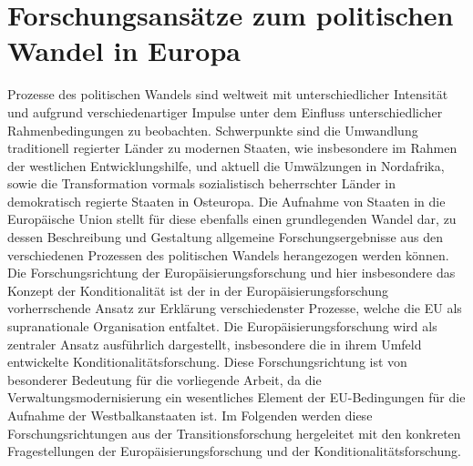 \chapter{Forschungsansätze zum politischen Wandel in Europa }
Prozesse des politischen Wandels sind weltweit mit unterschiedlicher Intensität und aufgrund verschiedenartiger Impulse unter dem Einfluss unterschiedlicher Rahmenbedingungen zu beobachten. Schwerpunkte sind die Umwandlung traditionell regierter Länder zu modernen Staaten, wie insbesondere im Rahmen der westlichen Entwicklungshilfe, und aktuell die Umwälzungen in Nordafrika, sowie die Transformation vormals sozialistisch beherrschter Länder in demokratisch regierte Staaten in Osteuropa. Die Aufnahme von Staaten in die Europäische Union stellt für diese ebenfalls einen grundlegenden Wandel dar, zu dessen Beschreibung und Gestaltung allgemeine Forschungsergebnisse aus den verschiedenen Prozessen des politischen Wandels herangezogen werden können. Die Forschungsrichtung der Europäisierungsforschung und hier insbesondere das Konzept der Konditionalität ist der in der Europäisierungsforschung vorherrschende Ansatz zur Erklärung verschiedenster Prozesse, welche die EU als supranationale Organisation entfaltet. Die Europäisierungsforschung wird als zentraler Ansatz ausführlich dargestellt, insbesondere die in ihrem Umfeld entwickelte Konditionalitätsforschung. Diese Forschungsrichtung ist von besonderer Bedeutung für die vorliegende Arbeit, da die Verwaltungsmodernisierung ein wesentliches Element der EU-Bedingungen für die Aufnahme der Westbalkanstaaten ist. Im Folgenden werden diese Forschungsrichtungen aus der Transitionsforschung hergeleitet mit den konkreten Fragestellungen der Europäisierungsforschung und der Konditionalitätsforschung. 

